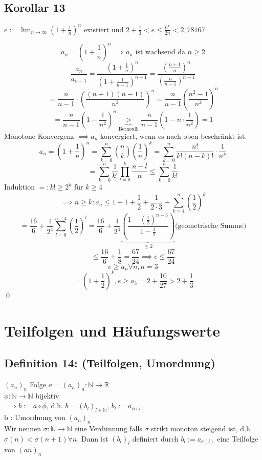 \documentclass[fleqn]{scrbook}
\newcommand{\R}{\mathbb{R}}
\newcommand{\N}{\mathbb{N}}
\renewenvironment{proof}{{\bfseries Beweis }}{\qed}
\begin{document}
\subsection{Korollar 13}
$e := \lim_{n \rightarrow \infty} (1 + \frac{1}{n})^n$ existiert und $2 + \frac{1}{3} < e \leq \frac{6^7}{2n} < 2,78167$

\begin{proof}
\[a_n = (1 + \frac{1}{n})^n \implies a_n\text{ ist wachsend da } n\geq 2\]
\[\frac{a_n}{a_{n-1}} = \frac{(1+\frac{1}{n})^n}{(1+\frac{1}{n-1})^{n-1}} = \frac{(\frac{n+1}{n})^n}{(\frac{n}{n-1})^{n-1}}\]
\[= \frac{n}{n-1}  \cdot  (\frac{(n+1)(n-1)}{n^2})^n = \frac{n}{n-1} (\frac{n^2 - 1}{n^2})^n\]
\[= \frac{n}{n-1} (1-\frac{1}{n^2})^n \underbrace{>}_{\text{Bernoulli}} \frac{n}{n-1} (1 - n  \cdot  \frac{1}{n^2}) = 1\]
Monotone Konvergenz $\implies a_n$ konvergiert, wenn es nach oben beschränkt ist.
\[a_n = (1 + \frac{1}{n})^n = \sum_{k = 0}^n \binom{n}{k} (\frac{1}{n})^k = \sum_{k=0}^n \frac{n!}{k!(n-k)!}  \cdot  \frac{1}{n^k}\]
\[= \sum_{k =0}^n \frac{1}{k!} \prod_{l=0}^k \frac{n-l}{n} \leq \sum_{k=0}^n \frac{1}{k!}\]
Induktion $=: k! \geq 2^k$ für $k\geq 4$
\[\implies n \geq k: a_n \leq 1 + 1 + \frac{1}{2} +  \frac{1}{2  \cdot  3} + \sum_{k = 4}^n (\frac{1}{2})^k\]
\[= \frac{16}{6} + \frac{1}{2^4} \sum_{l = 0}^{n-4} (\frac{1}{2})^l = \frac{16}{6} + \frac{1}{2^4} \underbrace{(\frac{1-(\frac{1}{2})^{n-3}}{1-\frac{1}{2}})}_{\leq 2} \text{(geometrische Summe)}\]
\[\leq \frac{16}{6} + \frac{1}{8} = \frac{67}{24} \implies e \leq \frac{67}{24}\]
\[e \geq a_n \forall n, n = 3\]
\[=(1 + \frac{1}{2})^k, e \geq a_3 = 2 + \frac{10}{27} > 2 + \frac{1}{3}\]
\end{proof}
\section{Teilfolgen und Häufungswerte}
\subsection{Definition 14: (Teilfolgen, Umordnung)} $(a_n)_n$ Folge $a = (a_n)_{n}: \N \rightarrow \R$\\
$\phi : \N \rightarrow \N$ bijektiv\\
$\implies b:= a \circ \phi$, d.h. $b = (b_l)_{l\in\N}$, $b_l := a_{\phi (l)}$\\
b : Umordnung von $(a_n)_n$\\
Wir nennen $\sigma : \N \rightarrow \N$ eine Verdünnung falls $\sigma$ strikt monoton steigend ist, d.h. $\sigma (n) < \sigma (n+1) \forall n$. Dann ist $(b_l)_l$ definiert durch $b_l := a_{\sigma (l)}$ eine Teilfolge von $(an)_n$
\end{document}
